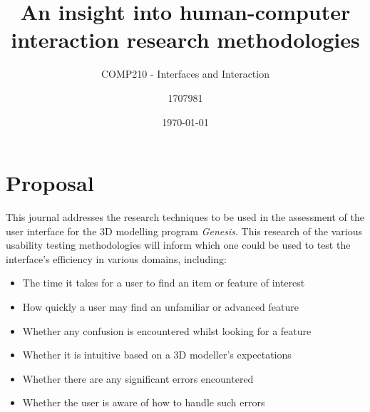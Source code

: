 \documentclass{scrartcl}
\title{An insight into human-computer interaction research methodologies}
\subtitle{COMP210 - Interfaces and Interaction}
\date{\today}
\author{1707981}
\begin{document}
\maketitle
{}



\section{Proposal}
This journal addresses the research techniques to be used in the assessment of the user interface for the 3D modelling program \textit{Genesis}. This research of the various usability testing methodologies will inform which one could be used to test the interface's efficiency in various domains, including:

\begin{itemize}
	\item The time it takes for a user to find an item or feature of interest
	\item How quickly a user may find an unfamiliar or advanced feature
	\item Whether any confusion is encountered whilst looking for a feature
	\item Whether it is intuitive based on a 3D modeller's expectations
	\item Whether there are any significant errors encountered
	\item Whether the user is aware of how to handle such errors
\end{itemize}
\end{document}
